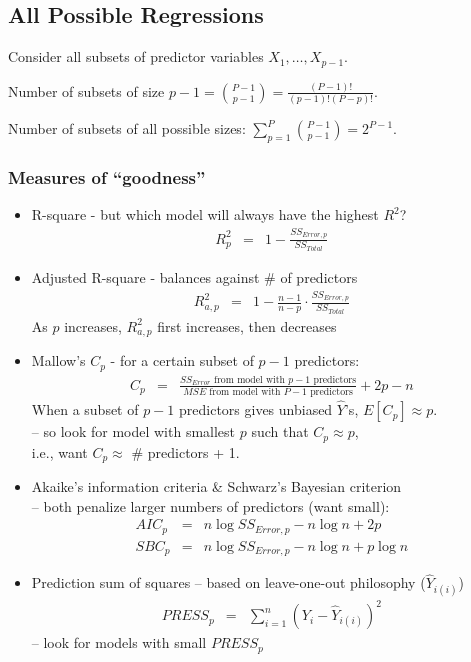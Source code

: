 \documentclass[12pt]{../notes}
\begin{document}
\subsection{All Possible Regressions}
Consider all subsets of predictor variables $X_1,  \ldots , X_{p-1}$. 

\bi
\item Number of subsets of size $p-1 = \binom{P-1}{p-1} = \frac{(P-1)!}{(p-1)!(P-p)!}$.
\item Number of subsets of all possible sizes: $\sum_{p=1}^P \binom{P-1}{p-1} = 2^{P-1}$.
\ei

\subsubsection{Measures of ``goodness''}
\begin{itemize}
     \item R-square - but which model will always have the highest $R^2$?
        \begin{eqnarray}
           R^2_p & = & 1 - \frac{SS_{Error,p}}{SS_{Total}} \nonumber
        \end{eqnarray}
     \item Adjusted R-square - balances against \# of predictors
        \begin{eqnarray}
           R^2_{a,p} & = & 1 - \frac{n-1}{n-p}\cdot\frac{SS_{Error,p}}{SS_{Total}} \nonumber
        \end{eqnarray}
       As $p$ increases, $R^2_{a,p}$ first increases, then decreases
     \item Mallow's $C_p$ - for a certain subset of $p-1$ predictors:
        \begin{eqnarray}
           C_p & = & \frac{\mbox{$SS_{Error}$ from model with $p-1$ predictors}}{\mbox{$MSE$ from model with $P-1$ predictors}} + 2p - n \nonumber
        \end{eqnarray}
        When a subset of $p-1$ predictors gives unbiased $\hat{Y}$'s, $E[C_p] \approx p$.\\
     -- so look for model with smallest $p$ such that $C_p \approx p$,\\ i.e., want $C_p \approx$ \# predictors + 1.
    \item Akaike's information criteria \& Schwarz's Bayesian criterion\\
    -- both penalize larger numbers of predictors (want small):
        \begin{eqnarray}
           AIC_p & = & n \log SS_{Error,p} - n \log n + 2 p \nonumber \\
           SBC_p & = & n \log SS_{Error,p} - n \log n + p \log n \nonumber
        \end{eqnarray}
    \item Prediction sum of squares -- based on leave-one-out philosophy ($\hat{Y}_{i(i)}$)
       \begin{eqnarray}
          PRESS_p & = & \sum_{i=1}^n \left(Y_i - \hat{Y}_{i(i)} \right)^2 \nonumber
       \end{eqnarray}
    -- look for models with small $PRESS_p$
    \end{itemize}
\end{document}
